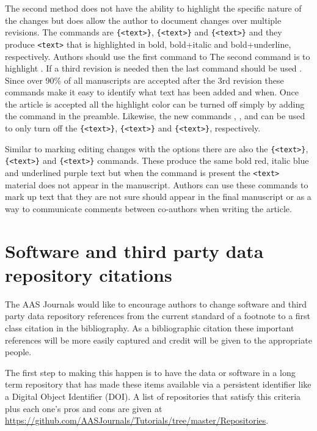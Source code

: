 \documentclass[linenumbers]{aastex631}
\begin{document}
The second method does not have the ability to highlight the specific
nature of the changes but does allow the author to document changes over
multiple revisions.  The commands are {\tt\string{}\{<text>\}},
{\tt\string{}\{<text>\}} and {\tt\string{}\{<text>\}} and they
produce {\tt\string<text>} that is highlighted in bold, bold+italic and
bold+underline, respectively.  Authors should use the first command to
  The
second command is to highlight .  If a third revision is needed then the last command should be used 
.  Since over 90\% of all manuscripts are
accepted after the 3rd revision these commands make it easy to identify
what text has been added and when.  Once the article is accepted all the
highlight color can be turned off simply by adding the
{\tt\string\turnoffediting} command in the preamble. Likewise, the new commands
{\tt\string\turnoffeditone}, {\tt\string\turnoffedittwo}, and
{\tt\string\turnoffeditthree} can be used to only turn off the 
{\tt\string{}\{<text>\}}, {\tt\string{}\{<text>\}} and 
{\tt\string{}\{<text>\}}, respectively.

Similar to marking editing changes with the {\tt\string\edit} options there
are also the {\tt\string{}\{<text>\}}, 
{\tt\string{}\{<text>\}} and
{\tt\string{}\{<text>\}} commands.  These produce the same
bold red, italic blue and underlined purple text but when the
{\tt\string\turnoffediting} command is present the {\tt\string<text>}
material does not appear in the manuscript.  Authors can use these commands
to mark up text that they are not sure should appear in the final
manuscript or as a way to communicate comments between co-authors when
writing the article.

\section{Software and third party data repository citations} \label{sec:cite}

The AAS Journals would like to encourage authors to change software and
third party data repository references from the current standard of a
footnote to a first class citation in the bibliography.  As a bibliographic
citation these important references will be more easily captured and credit
will be given to the appropriate people.

The first step to making this happen is to have the data or software in
a long term repository that has made these items available via a persistent
identifier like a Digital Object Identifier (DOI).  A list of repositories
that satisfy this criteria plus each one's pros and cons are given at \break
\url{https://github.com/AASJournals/Tutorials/tree/master/Repositories}.
\end{document}
